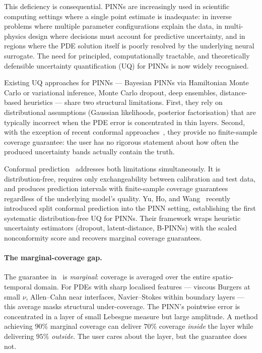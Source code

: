 \documentclass[11pt]{article}
\theoremstyle{definition}
\theoremstyle{remark}
\begin{document}
This deficiency is consequential. PINNs are increasingly used in scientific computing settings where a single point estimate is inadequate: in inverse problems where multiple parameter configurations explain the data, in multi-physics design where decisions must account for predictive uncertainty, and in regions where the PDE solution itself is poorly resolved by the underlying neural surrogate. The need for principled, computationally tractable, and theoretically defensible uncertainty quantification (UQ) for PINNs is now widely recognised.

Existing UQ approaches for PINNs --- Bayesian PINNs via Hamiltonian Monte Carlo or variational inference, Monte Carlo dropout, deep ensembles, distance-based heuristics --- share two structural limitations. First, they rely on distributional assumptions (Gaussian likelihoods, posterior factorisation) that are typically incorrect when the PDE error is concentrated in thin layers. Second, with the exception of recent conformal approaches~\cite{yu2025cp}, they provide no finite-sample coverage guarantee: the user has no rigorous statement about how often the produced uncertainty bands actually contain the truth.

Conformal prediction~\cite{vovk2005,angelopoulos2022gentle} addresses both limitations simultaneously. It is distribution-free, requires only exchangeability between calibration and test data, and produces prediction intervals with finite-sample coverage guarantees regardless of the underlying model's quality. Yu, Ho, and Wang~\cite{yu2025cp} recently introduced split conformal prediction into the PINN setting, establishing the first systematic distribution-free UQ for PINNs. Their framework wraps heuristic uncertainty estimators (dropout, latent-distance, B-PINNs) with the scaled nonconformity score and recovers marginal coverage guarantees.

\paragraph{The marginal-coverage gap.} The guarantee in~\cite{yu2025cp} is \emph{marginal}: coverage is averaged over the entire spatio-temporal domain. For PDEs with sharp localised features --- viscous Burgers at small $\nu$, Allen--Cahn near interfaces, Navier--Stokes within boundary layers --- this average masks structural under-coverage. The PINN's pointwise error is concentrated in a layer of small Lebesgue measure but large amplitude. A method achieving $90\%$ marginal coverage can deliver $70\%$ coverage \emph{inside} the layer while delivering $95\%$ \emph{outside}. The user cares about the layer, but the guarantee does not.
\end{document}

